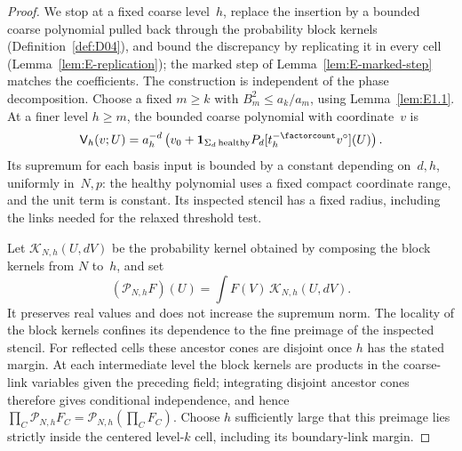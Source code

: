 \begin{proof}
We stop at a fixed coarse level~$h$, replace the insertion by a bounded coarse polynomial pulled back through the probability block kernels (Definition~\ref{def:D04}), and bound the discrepancy by replicating it in every cell (Lemma~\ref{lem:E-replication}); the marked step of Lemma~\ref{lem:E-marked-step} matches the coefficients. The construction is independent of the phase decomposition. Choose a fixed $m\ge k$ with $B_m^2\le a_k/a_m$, using Lemma~\ref{lem:E1.1}. At a finer level $h\ge m$, the bounded coarse polynomial with coordinate~$v$ is
\begin{equation*}
 \mathsf V_h(v;U)=a_h^{-d}\left(v_0+
 \mathbf1_{\Sigma_d\,\mathrm{healthy}}P_d[t_h^{-\factorcount}v^\circ](U)\right).
\end{equation*}
Its supremum for each basis input is bounded by a constant depending on~$d,h$, uniformly in~$N,p$: the healthy polynomial uses a fixed compact coordinate range, and the unit term is constant. Its inspected stencil has a fixed radius, including the links needed for the relaxed threshold test.

Let $\mathcal K_{N,h}(U,dV)$ be the probability kernel obtained by composing the block kernels from $N$ to~$h$, and set
\begin{equation*}
 (\mathcal P_{N,h}F)(U)=\int F(V)\,\mathcal K_{N,h}(U,dV).
\end{equation*}
It preserves real values and does not increase the supremum norm. The locality of the block kernels confines its dependence to the fine preimage of the inspected stencil. For reflected cells these ancestor cones are disjoint once $h$ has the stated margin. At each intermediate level the block kernels are products in the coarse-link variables given the preceding field; integrating disjoint ancestor cones therefore gives conditional independence, and hence $\prod_C\mathcal P_{N,h}F_C=\mathcal P_{N,h}(\prod_CF_C)$. Choose $h$ sufficiently large that this preimage lies strictly inside the centered level-$k$ cell, including its boundary-link margin.


\end{proof}
